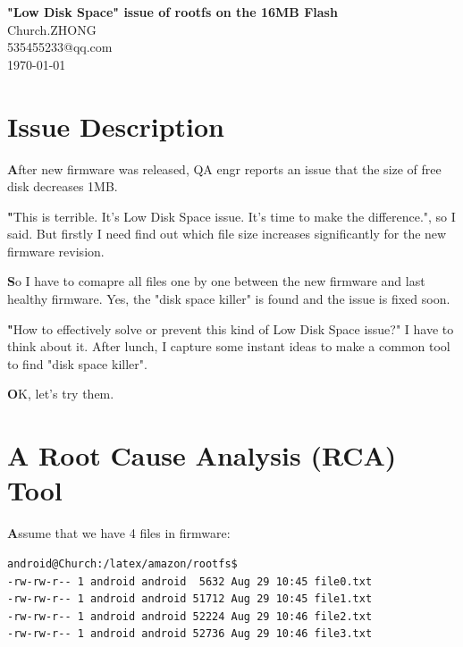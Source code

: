 \documentclass{article}
\begin{document}
\begin{titlepage}
	\begin{center}
		\Large\textbf{"Low Disk Space" issue of rootfs on the 16MB Flash}\\
		\vspace{1.0cm}
		\large\textsf{Church.ZHONG}\\
		\vspace{1.0cm}
		\large\textsf{535455233@qq.com}\\
		\vspace{1.0cm}
		\large\textsf{\today}
	\end{center}
\end{titlepage}

\setlength{\parindent}{20pt}

\section{Issue Description}

\textbf
After new firmware was released, QA engr reports an issue that the size of free disk decreases 1MB.

\textbf
"This is terrible. It's Low Disk Space issue. It's time to make the difference.", so I said.
But firstly I need find out which file size increases significantly for the new firmware revision.

\textbf
So I have to comapre all files one by one between the new firmware and last healthy firmware.
Yes, the "disk space killer" is found and the issue is fixed soon.

\textbf
"How to effectively solve or prevent this kind of Low Disk Space issue?" I have to think about it.
After lunch, I capture some instant ideas to make a common tool to find "disk space killer".

\textbf
OK, let's try them.


\section{A Root Cause Analysis (RCA) Tool}

\textbf
Assume that we have 4 files in firmware:


\begin{lstlisting}[language={[ansi]C}]
android@Church:/latex/amazon/rootfs$
-rw-rw-r-- 1 android android  5632 Aug 29 10:45 file0.txt
-rw-rw-r-- 1 android android 51712 Aug 29 10:45 file1.txt
-rw-rw-r-- 1 android android 52224 Aug 29 10:46 file2.txt
-rw-rw-r-- 1 android android 52736 Aug 29 10:46 file3.txt
    \end{lstlisting}
\end{document}
